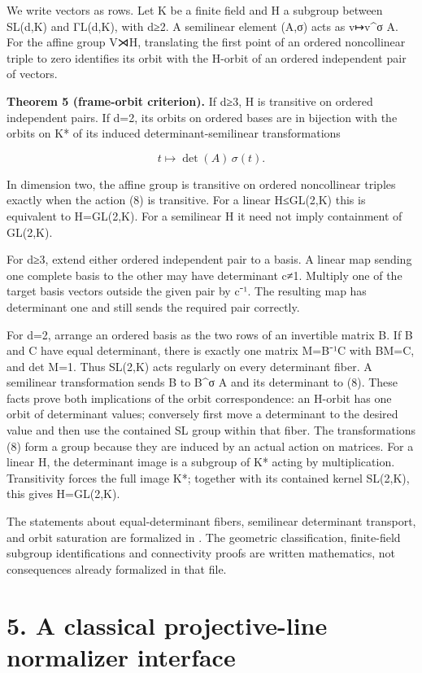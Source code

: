 \documentclass[
  11pt,
  a4paper,
]{article}
\renewcommand{\texttt}[1]{{\ttfamily\seqsplit{#1}}}
\begin{document}
We write vectors as rows. Let K be a finite field and H a subgroup
between SL(d,K) and ΓL(d,K), with d≥2. A semilinear element (A,σ) acts
as v↦v\^{}σ A. For the affine group V⋊H, translating the first point of
an ordered noncollinear triple to zero identifies its orbit with the
H-orbit of an ordered independent pair of vectors.

\textbf{Theorem 5 (frame-orbit criterion).} If d≥3, H is transitive on
ordered independent pairs. If d=2, its orbits on ordered bases are in
bijection with the orbits on K* of its induced determinant-semilinear
transformations

\[
 t\longmapsto \det(A)\,\sigma(t).
\tag{8}
\]

In dimension two, the affine group is transitive on ordered noncollinear
triples exactly when the action (8) is transitive. For a linear
H≤GL(2,K) this is equivalent to H=GL(2,K). For a semilinear H it need
not imply containment of GL(2,K).

For d≥3, extend either ordered independent pair to a basis. A linear map
sending one complete basis to the other may have determinant c≠1.
Multiply one of the target basis vectors outside the given pair by c⁻¹.
The resulting map has determinant one and still sends the required pair
correctly.

For d=2, arrange an ordered basis as the two rows of an invertible
matrix B. If B and C have equal determinant, there is exactly one matrix
M=B⁻¹C with BM=C, and det M=1. Thus SL(2,K) acts regularly on every
determinant fiber. A semilinear transformation sends B to B\^{}σ A and
its determinant to (8). These facts prove both implications of the orbit
correspondence: an H-orbit has one orbit of determinant values;
conversely first move a determinant to the desired value and then use
the contained SL group within that fiber. The transformations (8) form a
group because they are induced by an actual action on matrices. For a
linear H, the determinant image is a subgroup of K* acting by
multiplication. Transitivity forces the full image K*; together with its
contained kernel SL(2,K), this gives H=GL(2,K).

The statements about equal-determinant fibers, semilinear determinant
transport, and orbit saturation are formalized in
\texttt{phase265\_formal/DeterminantFibers.lean}. The geometric
classification, finite-field subgroup identifications and connectivity
proofs are written mathematics, not consequences already formalized in
that file.

\section{5. A classical projective-line normalizer
interface}\label{a-classical-projective-line-normalizer-interface}
\end{document}
